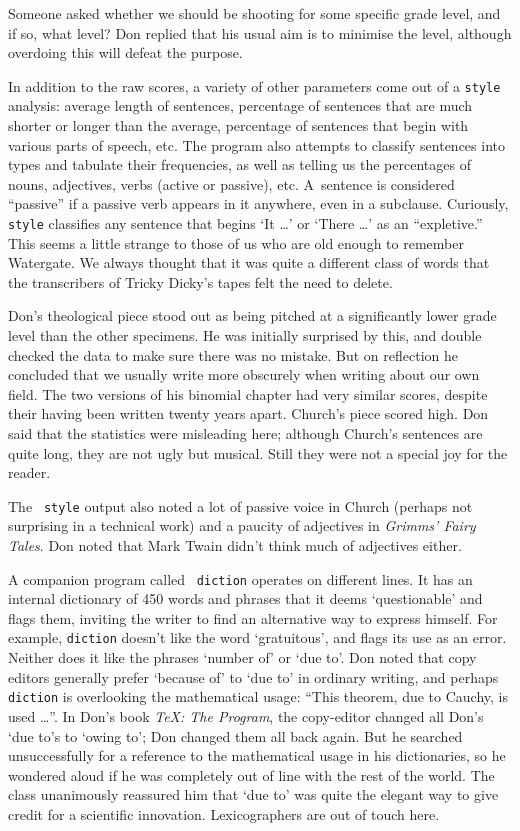 Someone asked whether we should be shooting for some specific grade
level, and if so, what level? Don replied that his usual aim is to
minimise the level, although overdoing this will defeat the purpose.

In addition to the raw scores,  a variety of other
parameters come out of a {\tt style} analysis:
  average length of sentences, percentage of sentences that
 are much shorter or longer than the average, 
percentage of sentences that begin with various parts of speech,
etc. The program also
attempts to classify sentences into types and tabulate their
frequencies, as well as telling us the percentages of nouns,
adjectives, verbs (active or passive), etc. 
 A~sentence  is considered
``passive'' if a passive verb
appears in it anywhere, even in a subclause.
Curiously, {\tt style} classifies any
sentence that begins `It \dots' or `There \dots' as an ``expletive.''
This seems a little strange to those of us who are old enough to
remember Watergate. We always thought that it was quite a different
class of words that the transcribers of Tricky Dicky's tapes felt the
need to delete. 

Don's theological piece stood out as being pitched at a significantly
lower grade level than the other specimens. 
He was initially surprised by this, and double checked the data
to make sure there was no mistake. But on reflection he concluded
that we usually 
 write more obscurely when writing about our own field.
The two versions of his binomial chapter had very similar scores,
despite their having been written twenty years apart. Church's piece
scored high. Don said that the statistics were misleading here;
although Church's sentences are quite long, they are not ugly but musical.
Still they were not a special joy for the reader.

The {\tt 
style} output also noted a lot of passive voice in Church (perhaps not
surprising in a technical work) and a paucity of adjectives in {\sl
Grimms' Fairy Tales}. Don noted that Mark Twain didn't think much of
adjectives either.

A companion program called {\tt
diction}  operates on different lines. It has an
internal dictionary of 450 words and phrases that it deems `questionable' and
flags them, inviting the writer to find an alternative way to express
himself.  For example, {\tt diction} 
doesn't like the word `gratuitous', and flags its use
as an error. Neither does it like the phrases `number of' or `due to'.
Don noted that  copy editors generally prefer `because of' to `due to' in ordinary
writing, and perhaps {\tt diction} is overlooking the mathematical usage:
``This theorem, due to Cauchy, is used \dots''. In Don's book {\sl  \TeX: The
Program}, the copy-editor changed all Don's `due to's to `owing to';
Don changed them all back again. 
But he searched unsuccessfully for a reference to
the mathematical usage in his
dictionaries, so he wondered aloud if he was completely out of line
with the rest of the world. The class unanimously reassured him that `due to'
was quite the elegant way to give credit for a scientific innovation.
Lexicographers are out of touch here.

